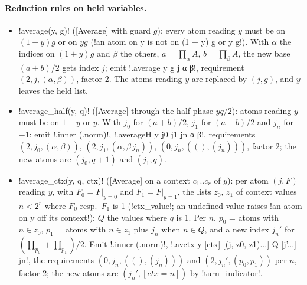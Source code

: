 {{{\paragraph{Reduction rules on held variables.}
\begin{itemize}
\item \lexpy!average(y, g)! ([Average] with guard $g$): every atom reading $y$ must be on
$(1+y)g$ or on $yg$ (\lexcode!an atom on y is not on (1 + y) g or y g!). With $\alpha$ the indices
on $(1+y)g$ and $\beta$ the others, $a = \prod_\alpha A$, $b=\prod_\beta A$, the new base
$(a+b)/2$ gets index $j$; emit \lexlean!.average y g j α β!, requirement $(2, j, (\alpha,\beta))$,
factor 2. The atoms reading $y$ are replaced by $(j, g)$, and $y$ leaves the held list.
\item \lexpy!average_half(y, q)! ([Average] through the half phase $yq/2$): atoms reading $y$ must
be on $1+y$ or $y$. With $j_0$ for $(a+b)/2$, $j_1$ for $(a-b)/2$ and $j_n$ for $-1$: emit
\lexlean!.inner (.norm)!, \lexlean!.averageH y j0 j1 jn α β!, requirements $(2, j_0, (\alpha,\beta))$,
$(2, j_1, (\alpha, \beta\,j_n))$, $(0, j_n, ((), (j_n)))$, factor 2; the new atoms are
$(j_0, q+1)$ and $(j_1, q)$.
\item \lexpy!average_ctx(y, q, ctx)! ([Average] on a context $c_1..c_r$ of $y$): per atom $(j,F)$
reading $y$, with $F_0 = F|_{y=0}$ and $F_1 = F|_{y=1}$, the lists $z_0$, $z_1$ of context
values $n<2^r$ where $F_0$ resp.\ $F_1$ is 1 (\lexpy!ctx_value!; an undefined value raises
\lexcode!an atom on y off its context!); $Q$ the values where $q$ is 1. Per $n$, $p_0$ = atoms with
$n\in z_0$, $p_1$ = atoms with $n\in z_1$ plus $j_n$ when $n\in Q$, and a new index $j_n'$ for
$(\prod_{p_0} + \prod_{p_1})/2$. Emit \lexlean!.inner (.norm)!,
\lexlean!.avctx y [ctx] [(j, z0, z1)...] Q [j'...] jn!, the requirements $(0, j_n, ((),(j_n)))$ and
$(2, j_n', (p_0, p_1))$ per $n$, factor 2; the new atoms are $(j_n', [\mathit{ctx}=n])$ by
\lexpy!turn_indicator!.
\end{itemize}

}}}

